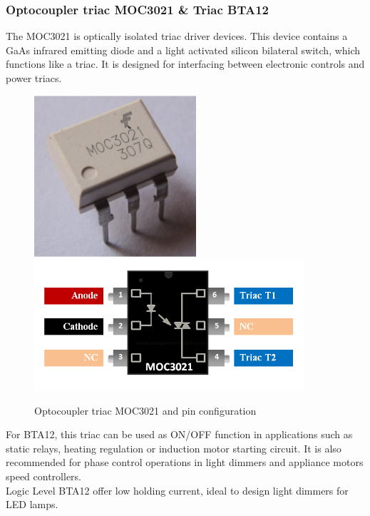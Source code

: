 \documentclass[a4paper]{article}
\begin{document}
\subsubsection{Optocoupler triac MOC3021 \& Triac BTA12}
The MOC3021 is optically isolated triac driver devices. This device contains a GaAs infrared emitting diode and a light activated silicon bilateral switch, which functions like a triac. It is designed for interfacing between electronic controls and power triacs.
\begin{figure}[h!]
\centering
{{\includegraphics[width=6cm]{images/moc_triac.jpg} }}
\qquad
{{\includegraphics[width=10cm]{images/mocpin.png} }}
\caption*{Optocoupler triac MOC3021 and pin configuration}
\end{figure}
\newline
\noindent
For BTA12, this triac can be used as ON/OFF function in applications such as static relays, heating regulation or induction motor starting circuit. It is also recommended for phase control operations in light dimmers and appliance motors speed controllers.\\
Logic Level BTA12 offer low holding current, ideal to design light dimmers for LED lamps.
\end{document}
